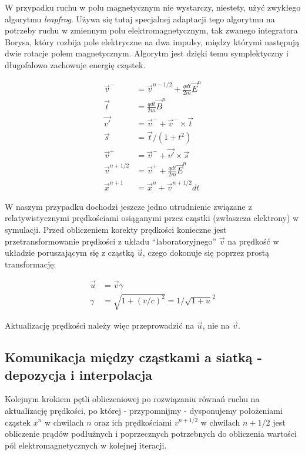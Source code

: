 W przypadku ruchu w polu magnetycznym nie wystarczy, niestety, użyć
zwykłego algorytmu \emph{leapfrog}. Używa się tutaj
specjalnej adaptacji tego algorytmu na potrzeby ruchu w zmiennym polu
elektromagnetycznym, tak zwanego integratora Borysa\cite{boris},
który rozbija pole elektryczne na dwa impulsy,
między którymi następują dwie rotacje polem magnetycznym. Algorytm jest
dzięki temu symplektyczny i długofalowo zachowuje energię cząstek.

\begin{align}
    \vec{v}^- &= \vec{v}^{n-1/2} + \frac{q dt}{2m} \vec{E}^n 
    \label{eqn:boris-pusher-start}\\
    \vec{t} &= \frac{q dt} {2 m} \vec{B}^n \\
    \vec{v'} &= \vec{v}^- + \vec{v}^- \times \vec{t} \\
    \vec{s} &= \vec{t} / {(1 + t^2)} \\
    \vec{v}^+ &= \vec{v}^- + \vec{v'} \times \vec{s} \\
    \vec{v}^{n+1/2} &= \vec{v}^+ + \frac{q dt}{2m} \vec{E}^n \\
    \vec{x}^{n+1} &= \vec{x}^{n} + \vec{v}^{n+1/2} dt
    \label{eqn:boris-pusher-end}
\end{align}

W naszym przypadku dochodzi jeszcze jedno utrudnienie związane z
relatywistycznymi prędkościami osiąganymi przez cząstki (zwłaszcza
elektrony) w symulacji. Przed obliczeniem korekty prędkości konieczne jest
przetransformowanie prędkości z układu ``laboratoryjnego'' $\vec{v}$ na
prędkość w układzie poruszającym się z cząstką $\vec{u}$, czego dokonuje
się poprzez prostą transformację:

\begin{align}
    \vec{u} &= \vec{v} \gamma \\
    \gamma &= \sqrt{1+{(v/c)}^2} = 1/\sqrt{1+u}^2
    \label{eqn:gamma-transformation}
\end{align}


Aktualizację prędkości należy więc przeprowadzić na $\vec{u}$, nie na $\vec{v}$.



\subsection{Komunikacja między cząstkami a siatką - depozycja i interpolacja}

Kolejnym krokiem pętli obliczeniowej po rozwiązaniu równań ruchu na
aktualizację prędkości, po której - przypomnijmy - dysponujemy położeniami
cząstek $x^n$ w chwilach $n$ oraz ich prędkościami $v^{n+1/2}$ w chwilach
$n+1/2$  jest obliczenie prądów podłużnych i
poprzecznych potrzebnych do obliczenia wartości pól elektromagnetycznych w
kolejnej iteracji.

